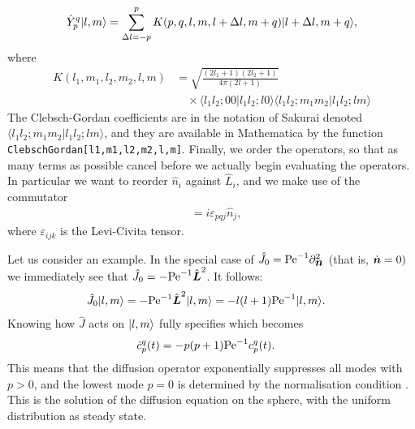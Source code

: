 \documentclass[thesis.tex]{subfiles}
\begin{document}
\begin{align*}
	\hat{Y}_p^q |l,m\rangle &= \sum_{\Delta l=-p}^{p}K(p,q,l,m,l+\Delta l, m+q)|l+\Delta l,m+q\rangle,\\
\end{align*}
where
\begin{align*}
	K(l_1, m_1, l_2, m_2, l, m) &= \sqrt{\frac{(2l_1+1)(2l_2+1)}{4\pi (2l+1)}} \\
	&\quad \times \langle l_1 l_2; 0 0|l_1l_2;l0\rangle
	\langle l_1 l_2; m_1 m_2|l_1l_2;lm\rangle
\end{align*}
The Clebsch-Gordan coefficients are in the notation of Sakurai denoted $\langle l_1 l_2; m_1 m_2|l_1l_2;lm\rangle$, and they are available in Mathematica by the function \texttt{ClebschGordan[{l1,m1},{l2,m2},{l,m}]}. Finally, we order the operators, so that as many terms as possible cancel before we actually begin evaluating the operators.
In particular we want to reorder $\hat{n}_i$ against $\hat{L}_i$, and we make use of the commutator
\begin{align*}
	[\hat{n}_p, \hat{L}_q] &= i\varepsilon_{pqj}\hat{n}_j,
\end{align*}
where $\varepsilon_{ijk}$ is the Levi-Civita tensor.

Let us consider an example. In the special case of $\hat J_0 = \mbox{Pe}^{-1} \partial_{\mbox{\boldmath$n$}}^2$ (that is, $\dot{\mbox{\boldmath$n$}}=0)$ we immediately see that $\hat J_0=-\mbox{Pe}^{-1} \hat{\mbox{\boldmath$L$}}^2$. It follows:
\begin{align*}
	\hat J_0 |l,m\rangle&=-\mbox{Pe}^{-1}\hat{\mbox{\boldmath$L$}}^2 |l,m\rangle = -l(l+1)\mbox{Pe}^{-1}|l,m\rangle.
\end{align*}
Knowing how $\hat J$ acts on $|l,m\rangle$ fully specifies  which becomes
\begin{align*}
	\dot c_p^q(t)  &= -p(p+1)\mbox{Pe}^{-1}c_p^q(t).
\end{align*}
This means that the diffusion operator exponentially suppresses all modes with $p>0$, and the lowest mode $p=0$ is determined by the normalisation condition . This is the solution of the diffusion equation on the sphere, with the uniform distribution as steady state.
\end{document}
